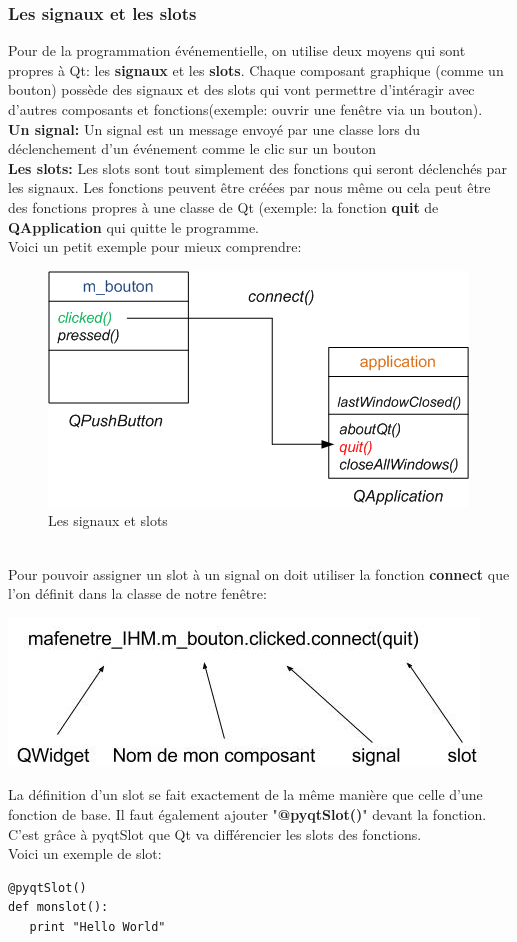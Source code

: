 \documentclass[a4paper,11pt]{article}
\begin{document}
\subsubsection{Les signaux et les slots}
Pour de la programmation événementielle, on utilise deux moyens qui sont propres à Qt: les \textbf{signaux} et les \textbf{slots}. Chaque composant graphique (comme un bouton) possède des signaux et des slots qui vont permettre d'intéragir avec d'autres composants et fonctions(exemple: ouvrir une fenêtre via un bouton).\\
\linebreak
\textbf{Un signal:} Un signal est un message envoyé par une classe lors du déclenchement d'un événement comme le clic sur un bouton\\
\textbf{Les slots:} Les slots sont tout simplement des fonctions qui seront déclenchés par les signaux. Les fonctions peuvent être créées par nous même ou cela peut être des fonctions propres à une classe de Qt (exemple: la fonction \textbf{quit} de \textbf{QApplication} qui quitte le programme.\\
Voici un petit exemple pour mieux comprendre:\\
\begin{figure}[hbtp]
\centering
\includegraphics[scale=0.5]{exemple_signal_slot.png}
\caption{Les signaux et slots}
\end{figure}\\
Pour pouvoir assigner un slot à un signal on doit utiliser la fonction \textbf{connect} que l'on définit dans la classe de notre fenêtre:
\begin{center}
\includegraphics[scale=0.4]{signal_slot.jpg} 
\end{center}
La définition d'un slot se fait exactement de la même manière que celle d'une fonction de base. Il faut également ajouter "\textbf{@pyqtSlot()}" devant la fonction. C'est grâce à pyqtSlot que Qt va différencier les slots des fonctions.\\
Voici un exemple de slot:
\begin{lstlisting}
@pyqtSlot()
def monslot():
   print "Hello World"
\end{lstlisting}
\end{document}
